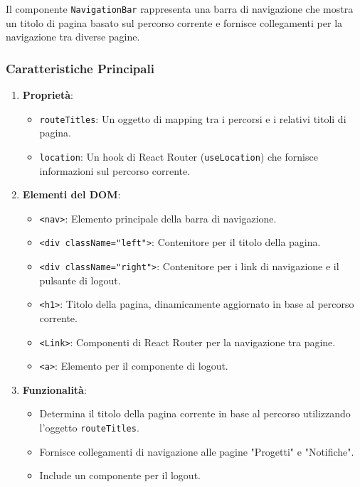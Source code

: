 \documentclass{article}
\begin{document}
Il componente \texttt{NavigationBar} rappresenta una barra di navigazione che mostra un titolo di pagina basato sul percorso corrente e fornisce collegamenti per la navigazione tra diverse pagine.

\subsubsection*{Caratteristiche Principali}

\begin{enumerate}
    \item \textbf{Proprietà}:
    \begin{itemize}
        \item \texttt{routeTitles}: Un oggetto di mapping tra i percorsi e i relativi titoli di pagina.
        \item \texttt{location}: Un hook di React Router (\texttt{useLocation}) che fornisce informazioni sul percorso corrente.
    \end{itemize}

    \item \textbf{Elementi del DOM}:
    \begin{itemize}
        \item \texttt{<nav>}: Elemento principale della barra di navigazione.
        \item \texttt{<div className="left">}: Contenitore per il titolo della pagina.
        \item \texttt{<div className="right">}: Contenitore per i link di navigazione e il pulsante di logout.
        \item \texttt{<h1>}: Titolo della pagina, dinamicamente aggiornato in base al percorso corrente.
        \item \texttt{<Link>}: Componenti di React Router per la navigazione tra pagine.
        \item \texttt{<a>}: Elemento per il componente di logout.
    \end{itemize}
    
    \item \textbf{Funzionalità}:
    \begin{itemize}
        \item Determina il titolo della pagina corrente in base al percorso utilizzando l'oggetto \texttt{routeTitles}.
        \item Fornisce collegamenti di navigazione alle pagine "Progetti" e "Notifiche".
        \item Include un componente per il logout.
    \end{itemize}
\end{enumerate}
\end{document}
